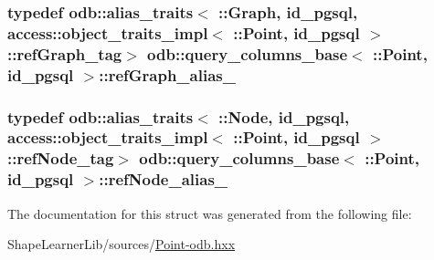 \subsubsection[{ref\+Graph\+\_\+alias\+\_\+}]{\setlength{\rightskip}{0pt plus 5cm}typedef odb\+::alias\+\_\+traits$<$ \+::{\bf Graph}, id\+\_\+pgsql, access\+::object\+\_\+traits\+\_\+impl$<$ \+::{\bf Point}, id\+\_\+pgsql $>$\+::ref\+Graph\+\_\+tag$>$ odb\+::query\+\_\+columns\+\_\+base$<$ \+::{\bf Point}, id\+\_\+pgsql $>$\+::{\bf ref\+Graph\+\_\+alias\+\_\+}}\label{structodb_1_1query__columns__base_3_01_1_1_point_00_01id__pgsql_01_4_a19b02b8f057af3570dba889095b17ccd}
\hypertarget{structodb_1_1query__columns__base_3_01_1_1_point_00_01id__pgsql_01_4_aa47a7e27f3d9c6033aaa352be5a32b02}{}
\subsubsection[{ref\+Node\+\_\+alias\+\_\+}]{\setlength{\rightskip}{0pt plus 5cm}typedef odb\+::alias\+\_\+traits$<$ \+::{\bf Node}, id\+\_\+pgsql, access\+::object\+\_\+traits\+\_\+impl$<$ \+::{\bf Point}, id\+\_\+pgsql $>$\+::ref\+Node\+\_\+tag$>$ odb\+::query\+\_\+columns\+\_\+base$<$ \+::{\bf Point}, id\+\_\+pgsql $>$\+::{\bf ref\+Node\+\_\+alias\+\_\+}}\label{structodb_1_1query__columns__base_3_01_1_1_point_00_01id__pgsql_01_4_aa47a7e27f3d9c6033aaa352be5a32b02}


The documentation for this struct was generated from the following file\+:\begin{DoxyCompactItemize}
\item 
Shape\+Learner\+Lib/sources/\hyperlink{_point-odb_8hxx}{Point-\/odb.\+hxx}\end{DoxyCompactItemize}

